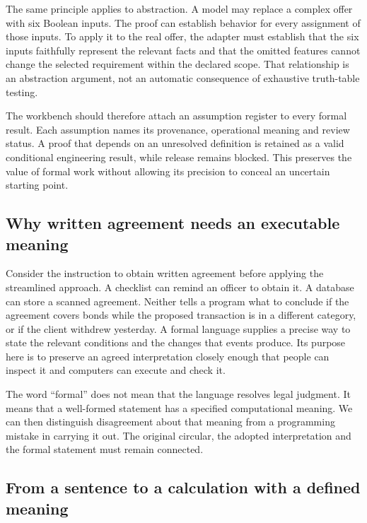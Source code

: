 \documentclass[12pt,a4paper,oneside,openany]{book}
\begin{document}
The same principle applies to abstraction. A model may replace a complex offer
with six Boolean inputs. The proof can establish behavior for every assignment
of those inputs. To apply it to the real offer, the adapter must establish that
the six inputs faithfully represent the relevant facts and that the omitted
features cannot change the selected requirement within the declared scope.
That relationship is an abstraction argument, not an automatic consequence of
exhaustive truth-table testing.

The workbench should therefore attach an assumption register to every formal
result. Each assumption names its provenance, operational meaning and review
status. A proof that depends on an unresolved definition is retained as a valid
conditional engineering result, while release remains blocked. This preserves
the value of formal work without allowing its precision to conceal an uncertain
starting point.

\subsection{Why written agreement needs an executable meaning}
\label{merge:P-01a-language-lesson:00}

\label{sec:language-lesson}

Consider the instruction to obtain written agreement before applying the
streamlined approach. A checklist can remind an officer to obtain it. A database
can store a scanned agreement. Neither tells a program what to conclude if the
agreement covers bonds while the proposed transaction is in a different category,
or if the client withdrew yesterday. A formal language supplies a precise way
to state the relevant conditions and the changes that events produce. Its
purpose here is to preserve an agreed interpretation closely enough that people
can inspect it and computers can execute and check it.

The word ``formal'' does not mean that the language resolves legal judgment.
It means that a well-formed statement has a specified computational meaning.
We can then distinguish disagreement about that meaning from a programming
mistake in carrying it out. The original circular, the adopted interpretation
and the formal statement must remain connected.

\subsection{From a sentence to a calculation with a defined meaning}
\label{merge:P-01a-language-lesson:01}
\end{document}
